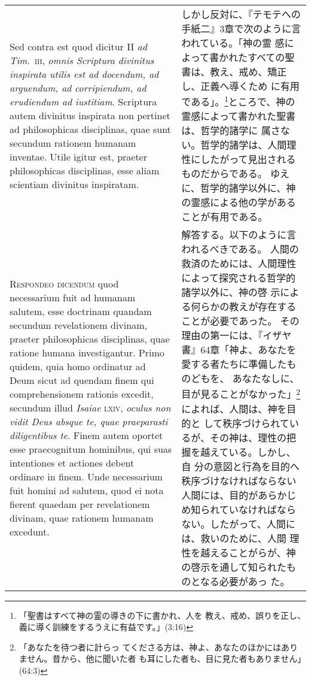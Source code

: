 \documentclass[10pt]{jsarticle} %
\begin{document}
\begin{longtable}{p{21em}p{21em}}
\\



Sed contra est quod dicitur II {\itshape ad Tim}.~{\scshape iii},
{\itshape omnis Scriptura divinitus inspirata utilis est ad docendum, ad
arguendum, ad corripiendum, ad erudiendum ad iustitiam}. Scriptura autem
divinitus inspirata non pertinet ad philosophicas disciplinas, quae sunt
secundum rationem humanam inventae. Utile igitur est, praeter
philosophicas disciplinas, esse aliam scientiam divinitus inspiratam.

&

しかし反対に、『テモテへの手紙二』3章で次のように言われている。「神の霊
 感によって書かれたすべての聖書は、教え、戒め、矯正し、正義へ導くため
 に有用である」。\footnote{「聖書はすべて神の霊の導きの下に書かれ、人を
 教え、戒め、誤りを正し、義に導く訓練をするうえに有益です。」(3:16)}ところで、神の霊感によって書かれた聖書は、哲学的諸学に
 属さない。哲学的諸学は、人間理性にしたがって見出されるものだからである。
 ゆえに、哲学的諸学以外に、神の霊感による他の学があることが有用である。

\\



{\scshape Respondeo dicendum} quod necessarium fuit ad
humanam salutem, esse doctrinam quandam secundum revelationem divinam,
praeter philosophicas disciplinas, quae ratione humana
investigantur. Primo quidem, quia homo ordinatur ad Deum sicut ad
quendam finem qui comprehensionem rationis excedit, secundum illud
{\itshape Isaiae} {\scshape lxiv}, {\itshape oculus non vidit Deus absque te, quae praeparasti
diligentibus te}. Finem autem oportet esse praecognitum hominibus, qui
suas intentiones et actiones debent ordinare in finem. Unde necessarium
fuit homini ad salutem, quod ei nota fierent quaedam per revelationem
divinam, quae rationem humanam excedunt. 

&

解答する。以下のように言われるべきである。
人間の救済のためには、人間理性によって探究される哲学的諸学以外に、神の啓
 示による何らかの教えが存在することが必要であった。
その理由の第一には、『イザヤ書』64章「神よ、あなたを愛する者たちに準備したものどもを、
 あなたなしに、目が見ることがなかった」\footnote{「あなたを待つ者に計らっ
 てくださる方は、神よ、あなたのほかにはありません。昔から、他に聞いた者
 も耳にした者も、目に見た者もありません」(64:3)}によれば、人間は、神を目的と
 して秩序づけられているが、その神は、理性の把握を越えている。しかし、自
 分の意図と行為を目的へ秩序づけなければならない人間には、目的があらかじ
 め知られていなければならない。したがって、人間には、救いのために、人間
 理性を越えることがらが、神の啓示を通して知られたものとなる必要があっ
 た。



\end{longtable}
\end{document}
